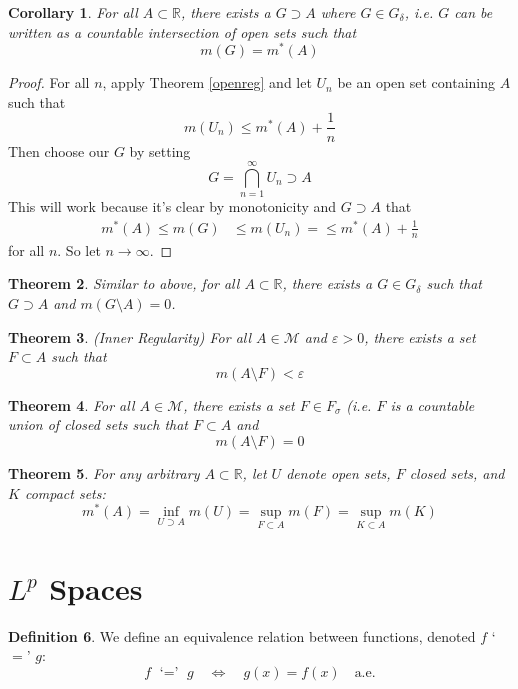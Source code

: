 \documentclass[12pt]{article}
\theoremstyle{plain}
\newtheorem{thm}{Theorem}[subsection]
\newtheorem{cor}[thm]{Corollary}
\theoremstyle{definition}
\newtheorem{defn}[thm]{Definition}
\theoremstyle{remark}
\begin{document}
\begin{cor}
For all $A\subset\mathbb{R}$, there exists a $G\supset A$ where $G \in G_\delta$, i.e. $G$ can be written as a countable intersection of open sets such that 
\[
    m(G) = m^*(A)
\]
\end{cor}
\begin{proof}
For all $n$, apply Theorem \ref{openreg} and let $U_n$ be an open set containing $A$ such that 
\[
    m(U_n) \leq m^*(A) + \frac{1}{n}
\]
Then choose our $G$ by setting
\[
    G = \bigcap^\infty_{n=1} U_n \supset A
\]
This will work because it's clear by monotonicity and $G\supset A$ that
\begin{align*}
    m^*(A) \leq m(G) &\leq m(U_n) =
    \leq m^*(A) + \frac{1}{n} 
\end{align*}
for all $n$. So let $n\rightarrow\infty$.
\end{proof}


\begin{thm} 
Similar to above, for all $A\subset\mathbb{R}$, there exists a $G \in G_\delta$ such that $G\supset A$ and $m(G\setminus A) = 0$.
\end{thm}

\begin{thm}
\emph{(Inner Regularity)}
For all $A\in\mathscr{M}$ and $\varepsilon>0$, there exists a set $F \subset A$ such that
\[
    m(A \setminus F) <\varepsilon
\]
\end{thm}

\begin{thm}
For all $A\in\mathscr{M}$, there exists a set $F\in F_\sigma$ (i.e. $F$ is a countable union of closed sets such that $F\subset A$ and 
\[
    m(A\setminus F) = 0
\]
\end{thm}

\begin{thm}
For any arbitrary $A\subset\mathbb{R}$, let $U$ denote open sets, $F$ closed sets, and $K$ compact sets:
\[
    m^*(A) = \inf_{U\supset A} m(U) = 
    \sup_{F\subset A} m(F) = \sup_{K\subset A} m(K)
\]
\end{thm}


\newpage
\section{$L^p$ Spaces}

\begin{defn}
We define an equivalence relation between functions, denoted $f$ `$=$' $g$:
\[
    f \text{ `$=$' } g
    \quad \Leftrightarrow\quad 
    g(x) = f(x) \quad \text{a.e.}
\]
\end{defn}
\end{document}
